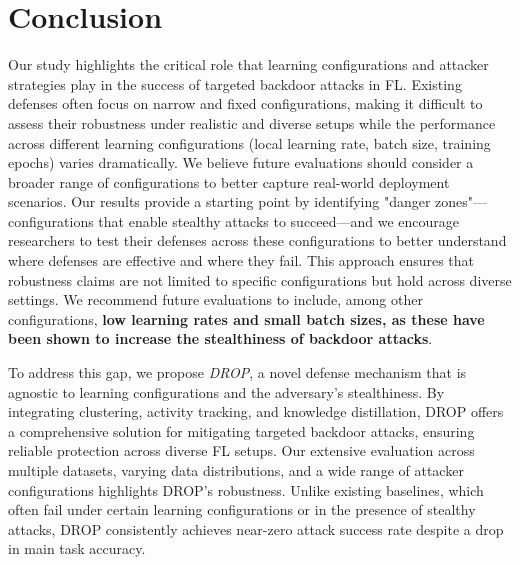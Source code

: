 \section{Conclusion}
\label{sec:conclusion}

Our study highlights the critical role that learning configurations and attacker strategies play in the success of targeted backdoor attacks in FL. Existing defenses often focus on narrow and fixed configurations, making it difficult to assess their robustness under realistic and diverse setups while the performance across different learning configurations (\ie local learning rate, batch size, training epochs) varies dramatically. We believe future evaluations should consider a broader range of configurations to better capture real-world deployment scenarios. Our results provide a starting point by identifying "danger zones"—configurations that enable stealthy attacks to succeed—and we encourage researchers to test their defenses across these configurations to better understand where defenses are effective and where they fail. This approach ensures that robustness claims are not limited to specific configurations but hold across diverse settings. We recommend future evaluations to include, among other configurations, \textbf{low learning rates and small batch sizes, as these have been shown to increase the stealthiness of backdoor attacks}.

To address this gap, we propose \textit{DROP}, a novel defense mechanism that is agnostic to learning configurations and the adversary's stealthiness. By integrating clustering, activity tracking, and knowledge distillation, DROP offers a comprehensive solution for mitigating targeted backdoor attacks, ensuring reliable protection across diverse FL setups. Our extensive evaluation across multiple datasets, varying data distributions, and a wide range of attacker configurations highlights DROP's robustness. Unlike existing baselines, which often fail under certain learning configurations or in the presence of stealthy attacks, DROP consistently achieves near-zero attack success rate despite a drop in main task accuracy.

